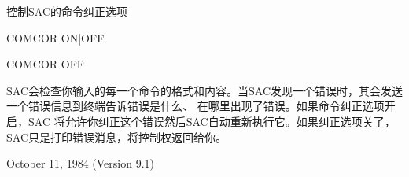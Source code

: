\label{cmd:comcor}

控制SAC的命令纠正选项

COMCOR {ON|OFF}

COMCOR OFF

SAC会检查你输入的每一个命令的格式和内容。当SAC发现一个错误时，其会发送一个错误信息到终端告诉错误是什么、
在哪里出现了错误。如果命令纠正选项开启，SAC	将允许你纠正这个错误然后SAC自动重新执行它。如果纠正选项关了，
SAC只是打印错误消息，将控制权返回给你。

October 11, 1984 (Version 9.1)
